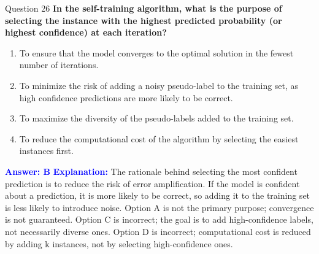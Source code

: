 \documentclass{beamer}
\begin{document}
	\begin{frame}{Question 26}
		\textbf{In the self-training algorithm, what is the purpose of selecting the instance with the highest predicted probability (or highest confidence) at each iteration?}
		\begin{enumerate}
			\item To ensure that the model converges to the optimal solution in the fewest number of iterations.
			\item To minimize the risk of adding a noisy pseudo-label to the training set, as high confidence predictions are more likely to be correct.
			\item To maximize the diversity of the pseudo-labels added to the training set.
			\item To reduce the computational cost of the algorithm by selecting the easiest instances first.
		\end{enumerate}
		\vspace{0.2cm}
		\textcolor{blue}{\textbf{Answer: B}}
		\vspace{0.2cm}
		\textcolor{blue}{\textbf{Explanation:}} The rationale behind selecting the most confident prediction is to reduce the risk of error amplification. If the model is confident about a prediction, it is more likely to be correct, so adding it to the training set is less likely to introduce noise. Option A is not the primary purpose; convergence is not guaranteed. Option C is incorrect; the goal is to add high-confidence labels, not necessarily diverse ones. Option D is incorrect; computational cost is reduced by adding k instances, not by selecting high-confidence ones.
	\end{frame}
	
\end{document}
